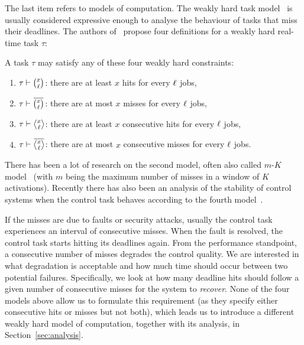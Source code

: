 The last item refers to models of computation.
The weakly hard task model~\cite{Hamdaoui:1995, Bernat:2001} is usually considered expressive enough to analyse the behaviour of tasks that miss their deadlines.
The authors of~\cite{Bernat:2001} propose four definitions for a weakly hard real-time task $\tau$:
\begin{definition}%
    \label{def:wh-models}%
    A task $\tau$ may satisfy any of these four weakly hard constraints:
    \begin{enumerate}[label=(\roman*)]
        \item $\tau \vdash \binom{x}{\ell}$: there are at least $x$ hits for every $\ell$ jobs,
        \item $\tau \vdash \overbar{\binom{x}{\numtotalanalysed}}$: there are at most $x$ misses for every $\ell$ jobs, 
        \item $\tau \vdash \genfrac{<}{>}{0pt}{}{x}{\numtotalanalysed}$: there are at least $x$ consecutive hits for every $\ell$ jobs,
        \item $\tau \vdash \overbar{\genfrac{<}{>}{0pt}{}{x}{\numtotalanalysed}}$: there are at most $x$ consecutive misses for every $\ell$ jobs.
    \end{enumerate}
\end{definition}

There has been a lot of research on the second model, often also called $m$-$K$ model~\cite{Koren:1995, Ramanathan:1997, Soudbakhsh:2013, Bund:2014, Frehse:2014, Bund:2015, Hammadeh:2017a, Hammadeh:2017b, Sun:2017, Ahrendts:2018, Soudbakhsh:2018, Pazzaglia:2018, Pazzaglia:2019, Gaukler:2019a} (with $m$ being the maximum number of misses in a window of $K$ activations).
Recently there has also been an analysis of the stability of control systems when the control task behaves according to the fourth model~\cite{Maggio:2020}.

If the misses are due to faults or security attacks, usually the control task experiences an interval of consecutive misses.
When the fault is resolved, the control task starts hitting its deadlines again.
From the performance standpoint, a consecutive number of misses degrades the control quality.
We are interested in what degradation is acceptable and how much time should occur between two potential failures.
Specifically, we look at how many deadline hits should follow a given number of consecutive misses for the system to \emph{recover}.
None of the four models above allow us to formulate this requirement (as they specify either consecutive hits or misses but not both), which leads us to introduce a different weakly hard model of computation, together with its analysis, in Section~\ref{sec:analysis}.
